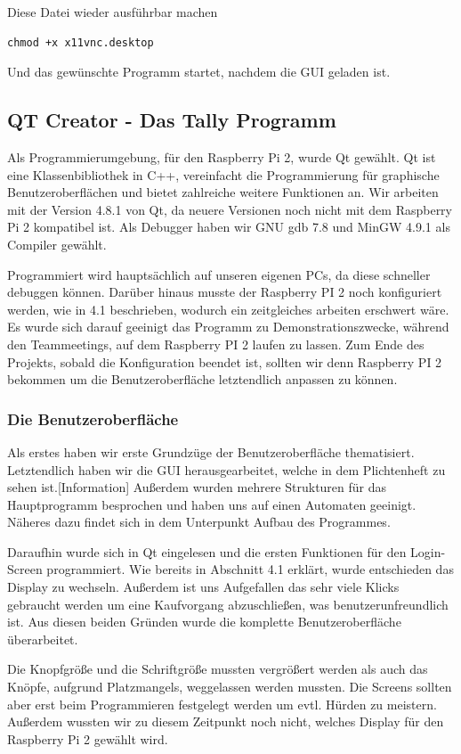 \documentclass[11pt,a4paper]{article} %
\begin{document}
Diese Datei wieder ausführbar machen
\begin{frame}

\begin{lstlisting}
chmod +x x11vnc.desktop
\end{lstlisting}
\end{frame}
Und das gewünschte Programm startet, nachdem die GUI geladen ist.

\newpage

\subsection{QT Creator - Das Tally Programm}
Als Programmierumgebung, für den Raspberry Pi 2, wurde Qt gewählt. \cite{13}
Qt ist eine Klassenbibliothek in C++, vereinfacht die Programmierung für graphische Benutzeroberflächen und bietet zahlreiche weitere Funktionen an.
Wir arbeiten mit der Version 4.8.1 von Qt, da neuere Versionen noch nicht mit dem Raspberry Pi 2 kompatibel ist.
Als Debugger haben wir GNU gdb 7.8 und MinGW 4.9.1 als Compiler gewählt.
\par
Programmiert wird hauptsächlich auf unseren eigenen PCs, da diese schneller debuggen können.
Darüber hinaus musste der Raspberry PI 2 noch konfiguriert werden, wie in 4.1 beschrieben, wodurch ein zeitgleiches arbeiten erschwert wäre.
Es wurde sich darauf geeinigt das Programm zu Demonstrationszwecke, während den Teammeetings, auf dem Raspberry PI 2 laufen zu lassen.
Zum Ende des Projekts, sobald die Konfiguration beendet ist, sollten wir denn Raspberry PI 2 bekommen um die Benutzeroberfläche letztendlich anpassen zu können.
\par
\subsubsection{Die Benutzeroberfläche}
Als erstes haben wir erste Grundzüge der Benutzeroberfläche thematisiert. Letztendlich haben wir die GUI herausgearbeitet, welche in dem Plichtenheft zu sehen ist.[Information]
Außerdem wurden mehrere Strukturen für das Hauptprogramm besprochen und haben uns auf einen Automaten geeinigt. Näheres dazu findet sich in dem Unterpunkt Aufbau des Programmes.
\par
Daraufhin wurde sich in Qt eingelesen und die ersten Funktionen für den Login-Screen programmiert. \cite{14} \cite{15}
Wie bereits in Abschnitt 4.1 erklärt, wurde entschieden das Display zu wechseln.
Außerdem ist uns Aufgefallen das sehr viele Klicks gebraucht werden um eine Kaufvorgang abzuschließen, was benutzerunfreundlich ist.
Aus diesen beiden Gründen wurde die komplette Benutzeroberfläche überarbeitet.
\par
Die Knopfgröße und die Schriftgröße mussten vergrößert werden als auch das Knöpfe, aufgrund Platzmangels, weggelassen werden mussten.
Die Screens sollten aber erst beim Programmieren festgelegt werden um evtl. Hürden zu meistern.
Außerdem wussten wir zu diesem Zeitpunkt noch nicht, welches Display für den Raspberry Pi 2 gewählt wird.
\par
\end{document}

